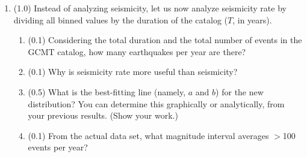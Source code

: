 \documentclass[11pt,titlepage,fleqn]{article}
\newcommand{\fmag}{frequency--magnitude}
\begin{document}
\begin{enumerate}
\begin{enumerate}
\begin{enumerate}
\item (0.3) $b$ is the slope. What is its physical meaning?

\end{enumerate}


\item (0.6) Assume that the best-fitting distribution (not the GCMT catalog) is `reality'. Based on the idealized cumulative distribution, what is largest earthquake expected over the duration of the GCMT catalog? (Show your work.)

Hint: Where does $N = 1$ intersect your best-fitting line?

Note: The expected value does not have to agree with what actually occurred within the GCMT catalog.


\item (0.2) The ``catalog completeness'' \citep[\eg][]{WiemerWyss2000} $M_c$ represents the smallest magnitude above which the \fmag\ distribution is representative for a particular seismicity catalog. What is the catalog completeness for GCMT? List your answer with 0.1 precision. (Provide a brief explanation, but no computation is necessary.)

\end{enumerate}


\item (1.0) Instead of analyzing seismicity, let us now analyze seismicity rate by dividing all binned values by the duration of the catalog ($T$, in years).
%
\begin{enumerate}
\item (0.1) Considering the total duration and the total number of events in the GCMT catalog, 
how many earthquakes per year are there?

\item (0.1) Why is seismicity rate more useful than seismicity?

\item (0.5) What is the best-fitting line (namely, $a$ and $b$) for the new distribution?
You can determine this graphically or analytically, from your previous results.
(Show your work.)

\item (0.1) From the actual data set, what magnitude interval averages $>$100 events per year?


\end{enumerate}
\end{enumerate}
\end{document}
